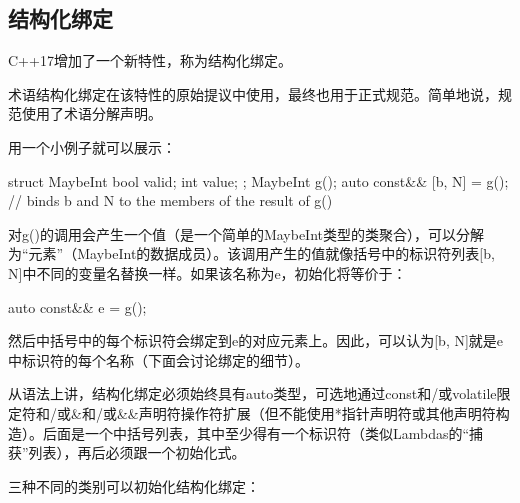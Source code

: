 \subsection{结构化绑定}

C++17增加了一个新特性，称为结构化绑定。

\begin{notice}
术语结构化绑定在该特性的原始提议中使用，最终也用于正式规范。简单地说，规范使用了术语分解声明。
\end{notice}

用一个小例子就可以展示：

\begin{cpp}
struct MaybeInt { bool valid; int value; };
MaybeInt g();
auto const&& [b, N] = g(); // binds b and N to the members of the result of g()
\end{cpp}

对g()的调用会产生一个值（是一个简单的MaybeInt类型的类聚合），可以分解为“元素”（MaybeInt的数据成员）。该调用产生的值就像括号中的标识符列表[b, N]中不同的变量名替换一样。如果该名称为e，初始化将等价于：

\begin{cpp}
auto const&& e = g();
\end{cpp}

然后中括号中的每个标识符会绑定到e的对应元素上。因此，可以认为[b, N]就是e中标识符的每个名称（下面会讨论绑定的细节）。

从语法上讲，结构化绑定必须始终具有auto类型，可选地通过const和/或volatile限定符和/或\&和/或\&\&声明符操作符扩展（但不能使用*指针声明符或其他声明符构造）。后面是一个中括号列表，其中至少得有一个标识符（类似Lambdas的“捕获”列表），再后必须跟一个初始化式。

三种不同的类别可以初始化结构化绑定：

